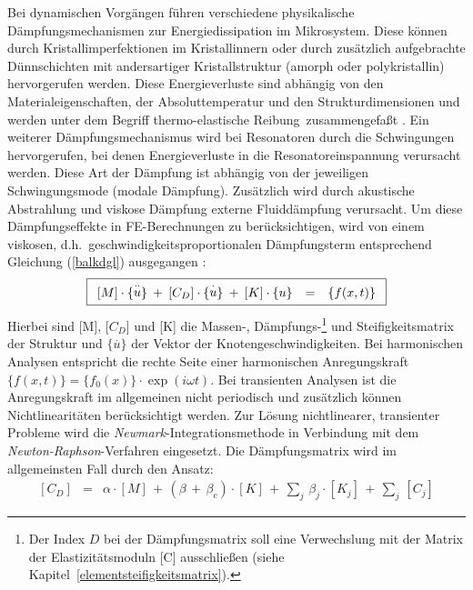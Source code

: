 Bei dynamischen Vorgängen führen verschiedene physikalische
Dämpfungsmechanismen zur Energiedissipation im Mikrosystem. Diese können
durch Kristallimperfektionen im Kristallinnern oder durch zusätzlich
aufgebrachte Dünnschichten mit andersartiger Kristallstruktur (amorph oder
polykristallin) hervorgerufen werden. Diese Energieverluste sind abhängig von
den Materialeigenschaften, der Absoluttemperatur und den Strukturdimensionen
und werden unter dem Begriff \glqq thermo-elastische Reibung\grqq \,
zusammengefaßt \cite{Ros90}.
Ein weiterer Dämpfungsmechanismus wird bei Resonatoren durch
die Schwingungen hervorgerufen, bei denen Energieverluste in die
Resonatoreinspannung verursacht werden. Diese Art der Dämpfung ist
abhängig von der jeweiligen Schwingungsmode (modale Dämpfung).
Zusätzlich wird durch akustische Abstrahlung und viskose Dämpfung
externe Fluiddämpfung verursacht. Um diese
Dämpfungseffekte in FE-Berechnungen zu berücksichtigen, wird von einem
viskosen, d.h.\ geschwindigkeitsproportionalen Dämpfungsterm entsprechend
Gleichung (\ref{balkdgl}) ausgegangen \cite{Koh92}:
\begin{equation}
\label{harmfreq}
\fbox{$
 \displaystyle
 \begin{array}{rcl}
 [M] \cdot \{\stackrel{\cdot \cdot}{u} \} \: +  \:
 [C_{D}] \cdot \{\stackrel{\cdot}{u}\} \: + \:
 [K] \cdot \{u\} & = & \{f(x,t)\}
 \end{array}
 $}
\end{equation}
Hierbei sind [M], [$C_{D}$] und [K] die Massen-, Dämpfungs-\footnote{Der
Index $D$ bei der Dämpfungsmatrix soll eine Verwechslung mit der Matrix der
Elastizitätsmoduln [C] ausschließen (siehe
Kapitel~\ref{elementsteifigkeitsmatrix}).}
und Steifigkeitsmatrix der Struktur und
$\{\stackrel{\cdot}{u}\}$ der Vektor der
Knotengeschwindigkeiten. Bei harmonischen Analysen entspricht die rechte
Seite einer harmonischen Anregungskraft
$\{f(x,t)\} = \{f_{0}(x)\} \cdot \exp(i \omega t)$. Bei transienten Analysen
ist die Anregungskraft im allgemeinen nicht periodisch und zusätzlich können
Nichtlinearitäten berücksichtigt werden. Zur Lösung nichtlinearer,
transienter Probleme wird die {\sl Newmark}-Integrationsmethode in
Verbindung mit dem {\sl Newton-Raphson}-Verfahren eingesetzt.
Die Dämpfungsmatrix wird im allgemeinsten Fall durch den Ansatz:
\begin{eqnarray}
\label{cmatrix}
 [C_{D}] & = & \alpha \cdot [M] \, + \, ( \beta \, + \, \beta_{c}) \cdot
           [K] \, + \, \sum_{j} \, \beta_{j} \cdot [K_{j}] \, + \,
            \sum_{j} \, [C_{j}]
\end{eqnarray}
